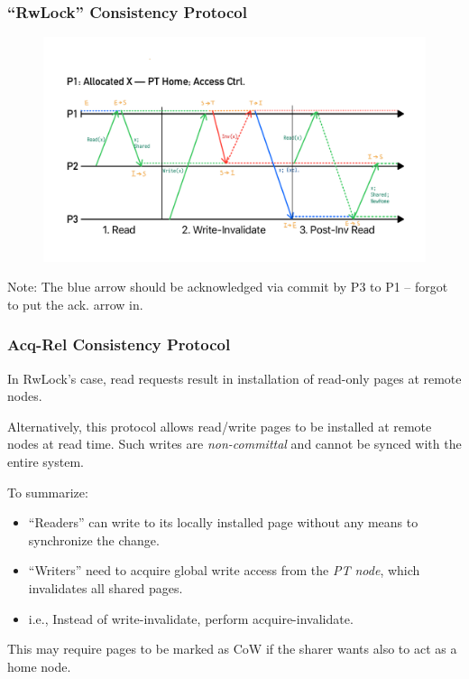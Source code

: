 \documentclass{beamer}
\begin{document}
\begin{frame}
    \frametitle{``RwLock'' Consistency Protocol}
    \begin{figure}
        \centering
        \includegraphics[width=\linewidth]{
            w12_slides_resources/Fig-RwLockProtocol 2023-12-04 21_03_50.pdf
        }
    \end{figure}
    Note: The blue arrow should be acknowledged via commit by P3 to P1 --
    forgot to put the ack. arrow in.
\end{frame}

\begin{frame}
    \frametitle{Acq-Rel Consistency Protocol}
    In RwLock's case, read requests result in installation of read-only pages at
    remote nodes.

    Alternatively, this protocol allows read/write pages to be installed at remote
    nodes at read time. Such writes are \emph{non-committal} and cannot be synced
    with the entire system.

    To summarize:
    \begin{itemize}
        \item {
            ``Readers'' can write to its locally installed page without any means
            to synchronize the change.
        }
        \item {
            ``Writers'' need to acquire global write access from the \emph{PT node},
            which invalidates all shared pages.
        }
        \item {
            i.e., Instead of write-invalidate, perform acquire-invalidate.
        }
    \end{itemize}

    This may require pages to be marked as CoW if the sharer wants also to act as a home node.
\end{frame}
\end{document}
